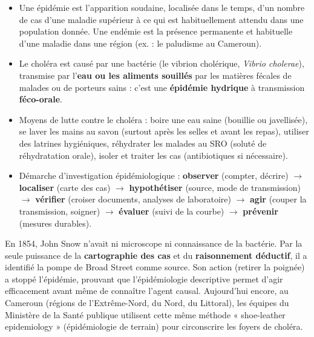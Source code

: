 \documentclass[11pt]{article}
\newcommand{\cle}[1]{{\popxbold\color{popdark}#1}}
\newcounter{popsec}
\newcounter{popsub}
\newcommand{\courssub}[1]{%
  \stepcounter{popsub}%
  \par\vspace{9pt}\noindent{\popxbold\fontsize{11.5}{13}\selectfont\color{popink}{\color{poporange}\thepopsec.\thepopsub}\hspace{6pt}#1}\par\nopagebreak\vspace{4pt}
}
\begin{document}
\courssub{Ressources à mobiliser}

\begin{aretenir}
\begin{itemize}
\item Une \cle{épidémie} est l'apparition soudaine, localisée dans le temps, d'un nombre de cas d'une maladie supérieur à ce qui est habituellement attendu dans une population donnée. Une \cle{endémie} est la présence permanente et habituelle d'une maladie dans une région (ex. : le paludisme au Cameroun).
\item Le choléra est causé par une \cle{bactérie} (le vibrion cholérique, \emph{Vibrio cholerae}), transmise par l'\textbf{eau ou les aliments souillés} par les matières fécales de malades ou de porteurs sains : c'est une \textbf{épidémie hydrique} à transmission \textbf{féco-orale}.
\item Moyens de lutte contre le choléra : boire une eau saine (bouillie ou javellisée), se laver les mains au savon (surtout après les selles et avant les repas), utiliser des latrines hygiéniques, réhydrater les malades au \cle{SRO} (soluté de réhydratation orale), isoler et traiter les cas (antibiotiques si nécessaire).
\item Démarche d'investigation épidémiologique : \textbf{observer} (compter, décrire) $\rightarrow$ \textbf{localiser} (carte des cas) $\rightarrow$ \textbf{hypothétiser} (source, mode de transmission) $\rightarrow$ \textbf{vérifier} (croiser documents, analyses de laboratoire) $\rightarrow$ \textbf{agir} (couper la transmission, soigner) $\rightarrow$ \textbf{évaluer} (suivi de la courbe) $\rightarrow$ \textbf{prévenir} (mesures durables).
\end{itemize}
\end{aretenir}

\begin{savaistu}
En 1854, John Snow n'avait ni microscope ni connaissance de la bactérie. Par la seule puissance de la \textbf{cartographie des cas} et du \textbf{raisonnement déductif}, il a identifié la pompe de Broad Street comme source. Son action (retirer la poignée) a stoppé l'épidémie, prouvant que l'épidémiologie descriptive permet d'agir efficacement avant même de connaître l'agent causal. Aujourd'hui encore, au Cameroun (régions de l'Extrême-Nord, du Nord, du Littoral), les équipes du Ministère de la Santé publique utilisent cette même méthode « shoe-leather epidemiology » (épidémiologie de terrain) pour circonscrire les foyers de choléra.
\end{savaistu}
\end{document}
